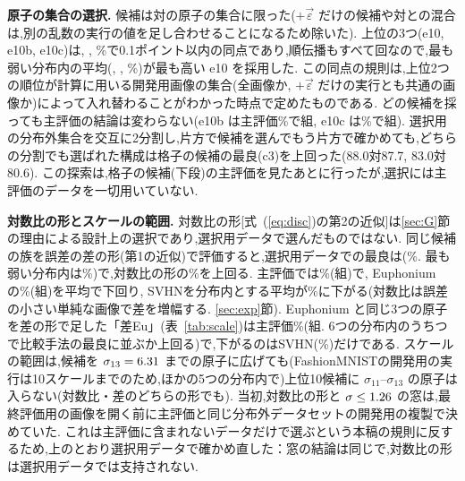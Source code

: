 \documentclass[MIRU,submit,onecolumn]{miru2025j}
\newcommand{\veps}{\vec{\varepsilon}}
\renewcommand{\eqref}[1]{(\ref{#1})}   %
\begin{document}
\textbf{原子の集合の選択.}
候補は対の原子の集合に限った($+\veps$ だけの候補や対との混合は,別の乱数の実行の値を足し合わせることになるため除いた). %
上位の3つ(e10, e10b, e10c)は\selMeanTwo, \selSecondTwo, \selThirdTwo\%で0.1ポイント以内の同点であり,順伝播もすべて\nfeG{}回なので,最も弱い分布内の平均(\selMinNew, \selMinSecond, \selMinThird\%)が最も高い e10 を採用した. %
この同点の規則は,上位2つの順位が計算に用いる開発用画像の集合(全画像か, $+\veps$ だけの実行とも共通の画像か)によって入れ替わることがわかった時点で定めたものである. どの候補を採っても主評価の結論は変わらない(e10b は主評価\secondMainMean\%で\secondWins{}組, e10c は\thirdMainMean\%で\thirdWins{}組). %
選択用の分布外集合を交互に2分割し,片方で候補を選んでもう片方で確かめても,どちらの分割でも選ばれた構成は格子の候補の最良(c3)を上回った(88.0対87.7, 83.0対80.6). %
この探索は,格子の候補(下段)の主評価を見たあとに行ったが,選択には主評価のデータを一切用いていない.

\textbf{対数比の形とスケールの範囲.}
対数比の形[式~\eqref{eq:disc}の第2の近似]は\ref{sec:G}節の理由による設計上の選択であり,選択用データで選んだものではない. 同じ候補の族を誤差の差の形(第1の近似)で評価すると,選択用データでの最良は\diffBestCand(\selDiffBest\%. 最も弱い分布内は\selDiffBestMin\%)で,対数比の形の\selMean\%を上回る. 主評価では\diffBestMain\%(\diffBestWins{}組)で, Euphonium の\meanSixG\%(\winsAll{}組)を平均で下回り, SVHNを分布内とする平均が\diffBestSVHN\%に下がる(対数比は誤差の小さい単純な画像で差を増幅する. \ref{sec:exp}節). Euphonium と同じ3つの原子を差の形で足した「差Eu」(表~\ref{tab:scale})は主評価\dEuMain\%(\dEuWins{}組. 6つの分布内のうち\dEuIDbest{}つで比較手法の最良に並ぶか上回る)で,下がるのはSVHN(\dEuSVHN\%)だけである. %
スケールの範囲は,候補を $\sigma_{13}=6.31$ までの原子に広げても(FashionMNISTの開発用の実行は10スケールまでのため,ほかの5つの分布内で)上位10候補に $\sigma_{11}$--$\sigma_{13}$ の原子は入らない(対数比・差のどちらの形でも). %
当初,対数比の形と $\sigma\le1.26$ の窓は,最終評価用の画像を開く前に主評価と同じ分布外データセットの開発用の複製で決めていた. これは主評価に含まれないデータだけで選ぶという本稿の規則に反するため,上のとおり選択用データで確かめ直した：窓の結論は同じで,対数比の形は選択用データでは支持されない.
\end{document}
